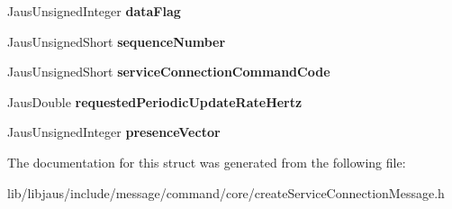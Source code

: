 \begin{DoxyCompactItemize}
\item 
\hypertarget{struct_create_service_connection_message_struct_a1ada3a8d92002747706232a762ad18d9}{\-Jaus\-Unsigned\-Integer {\bfseries data\-Flag}}\label{struct_create_service_connection_message_struct_a1ada3a8d92002747706232a762ad18d9}

\item 
\hypertarget{struct_create_service_connection_message_struct_ad75266a15cefb4ca35569bb6e4bc5fed}{\-Jaus\-Unsigned\-Short {\bfseries sequence\-Number}}\label{struct_create_service_connection_message_struct_ad75266a15cefb4ca35569bb6e4bc5fed}

\item 
\hypertarget{struct_create_service_connection_message_struct_a71648bcb0c89909844a321c8143034b2}{\-Jaus\-Unsigned\-Short {\bfseries service\-Connection\-Command\-Code}}\label{struct_create_service_connection_message_struct_a71648bcb0c89909844a321c8143034b2}

\item 
\hypertarget{struct_create_service_connection_message_struct_a4f682f55d1a7ce86d229a953b7d742f6}{\-Jaus\-Double {\bfseries requested\-Periodic\-Update\-Rate\-Hertz}}\label{struct_create_service_connection_message_struct_a4f682f55d1a7ce86d229a953b7d742f6}

\item 
\hypertarget{struct_create_service_connection_message_struct_a34a6d64b52460473ddee13ceab90e398}{\-Jaus\-Unsigned\-Integer {\bfseries presence\-Vector}}\label{struct_create_service_connection_message_struct_a34a6d64b52460473ddee13ceab90e398}

\end{DoxyCompactItemize}


\-The documentation for this struct was generated from the following file\-:\begin{DoxyCompactItemize}
\item 
lib/libjaus/include/message/command/core/create\-Service\-Connection\-Message.\-h\end{DoxyCompactItemize}
